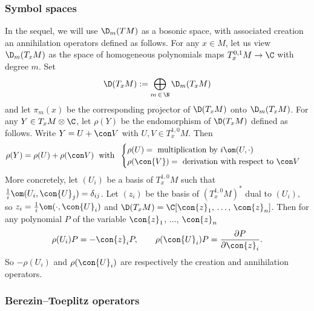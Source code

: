 \subsubsection{Symbol spaces}
In the sequel, we will use $\D_m (TM)$ as a bosonic space, with associated creation an annihilation operators defined as follows. For any $x \in M$, let us view $ \D_{m} (T_xM)$ as the space of homogeneous polynomials maps $T_x^{0,1} M \rightarrow \C$ with degree $m$. Set
\begin{gather}\label{eq:dtm_intro}
\D (T_xM) := \bigoplus_{m\,\in\,\N} \D_m (T_xM)
\end{gather}
and let $\pi_m(x)$ be the corresponding projector of $\D (T_x M)$ onto $\D_m (T_x M)$. For any $ Y
\in T_xM \otimes \C$, let $\rho (Y)$ be the endomorphism of $\D (T_xM)$ defined as follows. Write $Y = U + \con V$ with $U, V \in T_x ^{1,0} M$. Then
\begin{gather}\label{eq:rho}
\rho (Y)=
\rho (U) + \rho (\con V) \; \text{ with } \;
\begin{cases} \rho (U) = \text{
multiplication by } i
\om (U, \cdot) \\ \rho (\con {V}) = \text{ derivation with respect to } \con V
\end{cases}
\end{gather}
More concretely, let $(U_i)$ be a basis of $T^{1,0}_xM$ such that $\frac{1}{i} \om (U_i,
\con {U}_j) = \delta_{ij}$. Let $(z_i)$ be the basis of $(T^{1,0}_xM)^*$ dual to $(U_i)$, so $z_i = \frac{1}{i} \om (\cdot, \con{U}_i)$ and $ \D (T_x M) = \C [\con{z}_1, \,\ldots,\,\con{z}_n]$. Then for any polynomial $P$ of the variable $\con{z}_1$, $\ldots$, $\con{z}_n$
\begin{gather}
\rho (U_i) P = - \con{z}_i P, \qquad \rho (\con{U}_i) P = \frac{\partial P}{\partial
\con{z}_i}.
\end{gather}
So $-\rho (U_i)$ and $\rho (\con{U}_i)$ are respectively the creation and annihilation operators.

\subsubsection{Berezin--Toeplitz operators}

